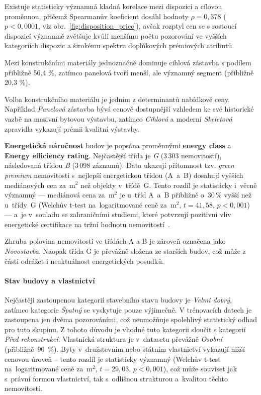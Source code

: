 Existuje statisticky významná kladná korelace mezi dispozicí a cílovou proměnnou, přičemž Spearmanův koeficient dosáhl hodnoty $\rho = 0{,}378$ ($p < 0{,}0001$, viz obr.~\ref{fig:disposition_price}), avšak rozptyl cen se s rostoucí dispozicí významně zvětšuje kvůli menšímu počtu pozorování ve vyšších kategoriích dispozic a širokému spektru doplňkových prémiových atributů.

Mezi konstrukčními materiály jednoznačně dominuje cihlová zástavba s podílem přibližně 56{,}4 \%, zatímco panelová tvoří menší, ale významný segment (přibližně 20{,}3 \%). 

Volba konstrukčního materiálu je jedním z determinantů nabídkové ceny. Například \emph{Panelová} zástavba bývá cenově dostupnější vzhledem ke své historické vazbě na masivní bytovou výstavbu, zatímco \emph{Cihlová} a moderní \emph{Skeletová} zpravidla vykazují prémii kvalitní výstavby.

\textbf{Energetická náročnost} budov je popsána proměnnými \textbf{energy class} a \textbf{Energy efficiency rating}. Nejčastější třída je \emph{G} (3\,303 nemovitostí), následovaná třídou \emph{B} (3\,098 záznamů). Data ukazují přítomnost tzv. \emph{green premium}  nemovitosti s~nejlepší energetickou třídou (A~a~B) dosahují vyšších mediánových cen za~$\mathrm{m}^2$ než objekty v~třídě~G. Tento rozdíl je statisticky i~věcně významný --- mediánová cena za~$\mathrm{m}^2$ je u~tříd A~a~B přibližně o~30\,\% vyšší než u~třídy~G (Welchův t-test na~logaritmované ceně za~$\mathrm{m}^2$, $t = 41{,}58$, $p < 0{,}001$) --- a~je v~souladu se zahraničními studiemi, které potvrzují pozitivní vliv energetické certifikace na tržní hodnotu nemovitostí~\cite{FuerstMcAllister2011}.

Zhruba polovina nemovitostí ve třídách A a B je zároveň označena jako \emph{Novostavba}. Naopak třída G je převážně složena ze starších budov, což může z části odrážet i neaktuálnost energetických posudků.

\paragraph{Stav budovy a vlastnictví}
Nejčastěji zastoupenou kategorií stavebního stavu budovy je \textit{Velmi dobrý}, zatímco kategorie \textit{Špatný} se vyskytuje pouze výjimečně. V trénovacích datech je zastoupena jen dvěma pozorováními, což neumožňuje spolehlivý statistický odhad pro tuto skupinu. Z tohoto důvodu je vhodné tuto kategorii sloučit s kategorií \textit{Před rekonstrukcí}. Vlastnická struktura je v~datasetu převážně \emph{Osobní} (přibližně~90~\%). Byty v~družstevním nebo státním vlastnictví vykazují nižší cenovou úroveň -- tento rozdíl je statisticky významný (Welchův t-test na~logaritmované ceně za~$\mathrm{m}^2$, $t = 29{,}03$, $p < 0{,}001$), což může souviset jak s~právní formou vlastnictví, tak s~odlišnou strukturou a~kvalitou těchto nemovitostí.

